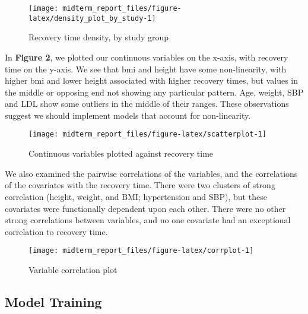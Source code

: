 \documentclass[
]{article}
\begin{document}
\begin{figure}

{\centering \texttt{[image: midterm\_report\_files/figure-latex/density\_plot\_by\_study-1]} 

}

\caption{Recovery time density, by study group}\label{fig:density_plot_by_study}
\end{figure}

In \textbf{Figure 2}, we plotted our continuous variables on the x-axis,
with recovery time on the y-axis. We see that bmi and height have some
non-linearity, with higher bmi and lower height associated with higher
recovery times, but values in the middle or opposing end not showing any
particular pattern. Age, weight, SBP and LDL show some outliers in the
middle of their ranges. These observations suggest we should implement
models that account for non-linearity.

\begin{figure}

{\centering \texttt{[image: midterm\_report\_files/figure-latex/scatterplot-1]} 

}

\caption{Continuous variables plotted against recovery time}\label{fig:scatterplot}
\end{figure}

We also examined the pairwise correlations of the variables, and the
correlations of the covariates with the recovery time. There were two
clusters of strong correlation (height, weight, and BMI; hypertension
and SBP), but these covariates were functionally dependent upon each
other. There were no other strong correlations between variables, and no
one covariate had an exceptional correlation to recovery time.

\begin{figure}

{\centering \texttt{[image: midterm\_report\_files/figure-latex/corrplot-1]} 

}

\caption{Variable correlation plot}\label{fig:corrplot}
\end{figure}

\hypertarget{model-training}{%
\subsection{Model Training}\label{model-training}}
\end{document}
